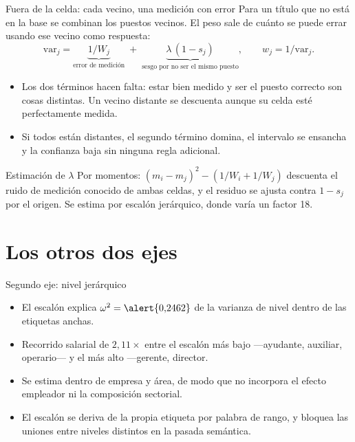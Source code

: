 \documentclass[11pt]{beamer}
\begin{document}
\begin{frame}{Fuera de la celda: cada vecino, una medición con error}
Para un título que no está en la base se combinan los puestos vecinos. El peso
sale de cuánto se puede errar usando ese vecino como respuesta:
\begin{equation*}
\mathrm{var}_j = \underbrace{1/W_j}_{\text{error de medición}}
\; + \; \underbrace{\lambda\,(1-s_j)}_{\text{sesgo por no ser el mismo puesto}},
\qquad w_j = 1/\mathrm{var}_j.
\end{equation*}
\begin{itemize}
\item Los dos términos hacen falta: estar bien medido y ser el puesto correcto
son cosas distintas. Un vecino distante \alert{se descuenta aunque su celda esté
perfectamente medida}.
\item Si todos están distantes, el segundo término domina, el intervalo se
ensancha y la confianza baja sin ninguna regla adicional.
\end{itemize}
\medskip
\begin{block}{Estimación de $\lambda$}
Por momentos: $(m_i - m_j)^2 - (1/W_i + 1/W_j)$ descuenta el ruido de medición
conocido de ambas celdas, y el residuo se ajusta contra $1 - s_j$ por el origen.
Se estima \alert{por escalón jerárquico}, donde varía un factor 18.
\end{block}
\end{frame}

\section{Los otros dos ejes}

\begin{frame}{Segundo eje: nivel jerárquico}
\begin{itemize}
\item El escalón explica $\omega^2 = \alert{0{,}2462}$ de la varianza de nivel
dentro de las etiquetas anchas.
\item Recorrido salarial de \alert{$2{,}11\times$} entre el escalón más bajo
---ayudante, auxiliar, operario--- y el más alto ---gerente, director.
\item Se estima \alert{dentro de empresa y área}, de modo que no incorpora el
efecto empleador ni la composición sectorial.
\item El escalón se deriva de la propia etiqueta por palabra de rango, y bloquea
las uniones entre niveles distintos en la pasada semántica.
\end{itemize}
\end{frame}
\end{document}
